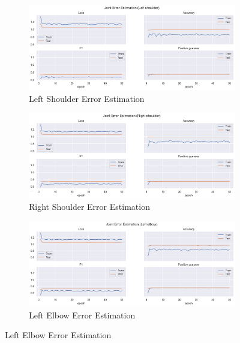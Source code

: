 \begin{figure}[!htbp]
  \centering
  \begin{subfigure}[b]{0.47\linewidth}
      \centering
      \includegraphics[width=\textwidth]{figures/Results/v1/jt/Left shoulder_ErrorEstimation.png}
      \caption{Left Shoulder Error Estimation}
      \label{fig:v1_lesh_jt_ee}
  \end{subfigure}
  \hfill
  \begin{subfigure}[b]{0.47\linewidth}
      \centering
      \includegraphics[width=\textwidth]{figures/Results/v1/jt/Right shoulder_ErrorEstimation.png}
      \caption{Right Shoulder Error Estimation}
      \label{fig:v1_rish_jt_ee}
  \end{subfigure}
  \hfill
  \begin{subfigure}[b]{0.47\linewidth}
      \centering
      \includegraphics[width=\textwidth]{figures/Results/v1/jt/Left ebpow_ErrorEstimation.png}
      \caption{Left Elbow Error Estimation}

\end{subfigure}
\end{figure}
